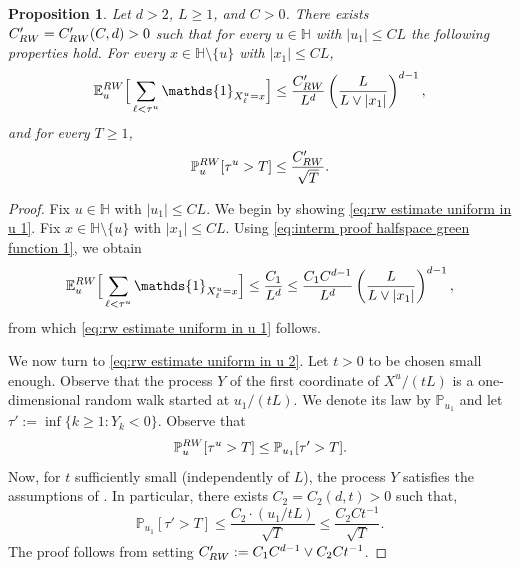 \documentclass[11pt,a4paper]{article}
\numberwithin{equation}{section}
\theoremstyle{plain}
\newtheorem{Prop}[Thm]{Proposition}
\theoremstyle{definition}
\begin{document}
\begin{Prop}\label{prop: rw estimates 2} Let $d>2$, $L\geq 1$, and $C>0$. There exists $C_{\rm RW}'=C_{\rm RW}'(C,d)>0$ such that for every $u\in \mathbb H$ with $|u_1|\leq CL$ the following properties hold. For every $x\in \mathbb H\setminus \{u\}$ with $|x_1|\leq CL$, 
\begin{equation}\label{eq:rw estimate uniform in u 1}
	\mathbb E_u^{\rm RW}\Big[\sum_{\ell<\tau^u}\mathds{1}_{X_\ell^u=x}\Big]\leq \frac{C_{\rm RW}'}{L^d}\left(\frac{L}{L\vee |x_1|}\right)^{d-1},
\end{equation}
and for every $T\geq 1$,
\begin{equation}\label{eq:rw estimate uniform in u 2}
	\mathbb P_u^{\rm RW}[\tau^u>T]\leq \frac{C_{\rm RW}'}{\sqrt{T}}.
\end{equation}
\end{Prop}
\begin{proof} Fix $u\in \mathbb H$ with $|u_1|\leq CL$. We begin by showing \eqref{eq:rw estimate uniform in u 1}. Fix $x\in \mathbb H\setminus \{u\}$ with $|x_1|\leq CL$. Using \eqref{eq:interm proof halfspace green function 1}, we obtain
\begin{equation}
	\mathbb E^{\rm RW}_u\Big[\sum_{\ell <\tau^u}\mathds{1}_{X_\ell^u=x}\Big]\leq \frac{C_1}{L^d}\leq \frac{C_1C^{d-1}}{L^d}\left(\frac{L}{L\vee |x_1|}\right)^{d-1},
\end{equation}
from which \eqref{eq:rw estimate uniform in u 1} follows.

We now turn to \eqref{eq:rw estimate uniform in u 2}. Let $t>0$ to be chosen small enough. Observe that the process $Y$ of the first coordinate of $X^u/(tL)$ is a one-dimensional random walk started at $u_1/(tL)$. We denote its law by $\mathbb P_{u_1}$ and let $\tau':=\inf\{k\geq 1: Y_k<0\}$. Observe that
\begin{equation}
	\mathbb P^{\rm RW}_u[\tau^u>T]\leq \mathbb P_{u_1}[\tau'>T].
\end{equation}
Now, for $t$ sufficiently small (independently of $L$), the process $Y$ satisfies the assumptions of \cite[Theorem~5.1.7]{LawlerLimicRandomWalks2010}. In particular, there exists $C_2=C_2(d,t)>0$ such that,
\begin{equation}
	\mathbb P_{u_1}[\tau'>T]\leq \frac{C_2 \cdot(u_1/tL)}{\sqrt{T}}\leq \frac{C_2 C t^{-1}}{\sqrt{T}}.
\end{equation}
The proof follows from setting $C_{\rm RW}':=C_1C^{d-1}\vee C_2 C t^{-1}$.
\end{proof}
\end{document}
